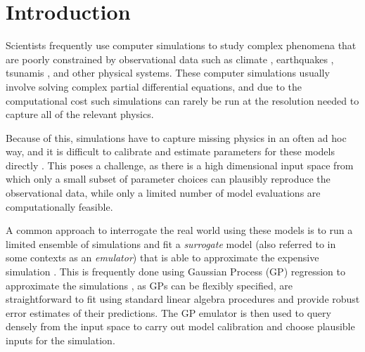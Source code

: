 \documentclass[openacc]{rstransa}%
\begin{document}

\begin{fmtext}


\end{fmtext}


\maketitle

\section{Introduction}

Scientists frequently use computer simulations to study complex phenomena that are poorly constrained by
observational data such as climate \cite{climate}, earthquakes \cite{earthquakedynamics},
tsunamis \cite{tsunami}, and other physical systems. These computer
simulations usually involve solving complex partial differential equations, and due to the computational
cost such simulations can rarely be run at the resolution needed to capture all of the relevant physics.

Because of this, simulations have to capture missing physics in an often ad hoc way, and it is difficult to
calibrate and estimate parameters for these models directly \cite{calibration}.
This poses a challenge, as there
is a high dimensional input space from which only a small subset of parameter choices can plausibly
reproduce the observational data, while only a limited number of model evaluations are computationally
feasible.

A common approach to interrogate the real world using these models is to run a limited ensemble of
simulations and fit a \emph{surrogate} model (also referred to in some contexts as an \emph{emulator})
that is able to approximate the expensive simulation \cite{experimentaldesign}.
This is frequently done using Gaussian Process (GP) regression to approximate the simulations \cite{gprw},
as GPs can be flexibly specified, are straightforward to fit using standard linear algebra procedures and
provide robust error estimates of their predictions.
The GP emulator is then used to query densely from the input space to carry out model calibration and
choose plausible inputs for the simulation.
\end{document}
